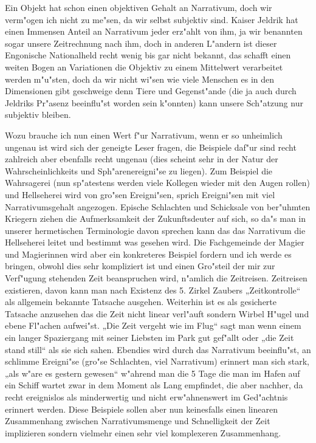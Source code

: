 \documentclass[a5paper,8pt]{book}
\begin{document}
Ein Objekt hat schon einen objektiven Gehalt an Narrativum, doch wir verm"ogen ich nicht zu me"sen, da wir selbst subjektiv sind. Kaiser Jeldrik hat einen Immensen Anteil an Narrativum jeder erz"ahlt von ihm, ja wir benannten sogar unsere Zeitrechnung nach ihm, doch in anderen L"andern ist dieser Engonische Nationalheld recht wenig bis gar nicht bekannt, das schafft einen weiten Bogen an Variationen die Objektiv zu einem Mittelwert verarbeitet werden m"u"sten, doch da wir nicht wi"sen wie viele Menschen es in den Dimensionen gibt geschweige denn Tiere und Gegenst"ande (die ja auch durch Jeldriks Pr"asenz beeinflu"st worden sein k"onnten) kann unsere Sch"atzung nur subjektiv bleiben.

Wozu brauche ich nun einen Wert f"ur Narrativum, wenn er so unheimlich ungenau ist wird sich der geneigte Leser fragen, die Beispiele daf"ur sind recht zahlreich aber ebenfalls recht ungenau (dies scheint sehr in der Natur der Wahrscheinlichkeits und Sph"arenereigni"se zu liegen). Zum Beispiel die Wahrsagerei (nun sp"atestens werden viele Kollegen wieder mit den Augen rollen) und Hellseherei wird von gro"sen Ereigni"sen, sprich Ereigni"sen mit viel Narrativumsgehalt angezogen. Epische Schlachten und Schicksale von ber"uhmten Kriegern ziehen die Aufmerksamkeit der Zukunftsdeuter auf sich, so da"s man in unserer hermetischen Terminologie davon sprechen kann das das Narrativum die Hellseherei leitet und bestimmt was gesehen wird.
Die Fachgemeinde der Magier und Magierinnen wird aber ein konkreteres Beispiel fordern und ich werde es bringen, obwohl dies sehr kompliziert ist und einen Gro"steil der mir zur Verf"ugung stehenden Zeit beanspruchen wird, n"amlich die Zeitreisen.
Zeitreisen existieren, davon kann man nach Existenz des 5. Zirkel Zaubers „Zeitkontrolle“ als allgemein bekannte Tatsache ausgehen. Weiterhin ist es als gesicherte Tatsache anzusehen das die Zeit nicht linear verl"auft sondern Wirbel H"ugel und ebene Fl"achen aufwei"st.
„Die Zeit vergeht wie im Flug“ sagt man wenn einem ein langer Spaziergang mit seiner Liebsten im Park gut gef"allt oder „die Zeit stand still“ als sie sich sahen. Ebendies wird durch das Narrativum beeinflu"st, an schlimme Ereigni"se (gro"se Schlachten, viel Narrativum) erinnert man sich stark, „als w"are es gestern gewesen“ w"ahrend man die 5 Tage die man im Hafen auf ein Schiff wartet zwar in dem Moment als Lang empfindet, die aber nachher, da recht ereignislos als minderwertig und nicht erw"ahnenswert im Ged"achtnis erinnert werden. Diese Beispiele sollen aber nun keinesfalls einen linearen Zusammenhang zwischen Narrativumsmenge und Schnelligkeit der Zeit implizieren sondern vielmehr einen sehr viel komplexeren Zusammenhang.
\end{document}
